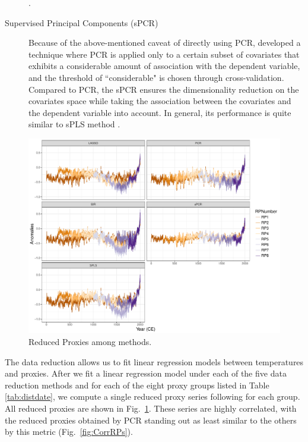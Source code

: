\documentclass[12pt]{amsart}
\theoremstyle{plain}
\theoremstyle{definition}
\theoremstyle{remark}
\begin{document}
\begin{description}
\citep{Jolliffe1982,Tibshirani1996}. 
\item[Supervised Principal Components (sPCR)]
Because of the above-mentioned caveat of directly using PCR, \cite{Bair2006} developed a technique where PCR is applied only
to a certain subset of covariates that exhibits a considerable amount of association
 with the dependent variable, and the threshold of ``considerable" is chosen through
cross-validation. Compared to PCR, the sPCR ensures the dimensionality
reduction on the covariates space while taking the association between
the covariates and the dependent variable into account. In general, its performance is quite similar to
sPLS method \citep{Chung2013}.  
\end{description}

\begin{figure}
  \centering
 \includegraphics[scale=0.40]{RPs_type} 
  \caption{Reduced Proxies among methods.}
  \label{fig:RPs}
\end{figure}

The data reduction allows us to fit linear regression models between
temperatures and proxies. After we fit a linear regression model under each of
the five data reduction methods and for each of the eight proxy groups listed in
Table \ref{tab:distdate}, we compute a single reduced proxy series following
\cite{Barboza2014} for each group. All reduced proxies are shown in Fig.~\ref{fig:RPs}.  These series are highly correlated, with the reduced proxies obtained by PCR standing out as least similar to the others by this metric (Fig.~\ref{fig:CorrRPs}).
\end{document}
